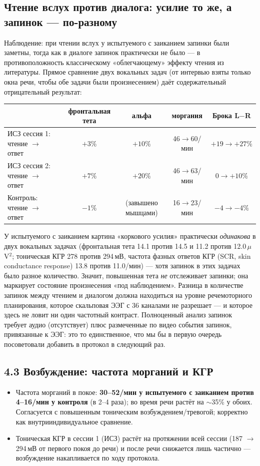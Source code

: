 \documentclass[11pt,a4paper]{article}
\begin{document}
\subsection*{Чтение вслух против диалога: усилие то же, а запинок --- по-разному}
Наблюдение: при чтении вслух у испытуемого с заиканием запинки были заметны, тогда как в диалоге
запинок практически не было --- в противоположность классическому «облегчающему» эффекту чтения
из литературы.
Прямое сравнение двух вокальных задач (от интервью взяты только окна речи, чтобы обе задачи были
произнесением) даёт содержательный отрицательный результат:
\begin{center}\small
\begin{tabular}{@{}lcccc@{}}
\toprule
& фронтальная тета & альфа & моргания & Брока L$-$R \\
\midrule
ИСЗ сессия 1: чтение $\to$ ответ & $+3\%$ & $+10\%$ & 46$\to$60/мин & $+19\to+27\%$ \\
ИСЗ сессия 2: чтение $\to$ ответ & $+7\%$ & $+20\%$ & 46$\to$63/мин & $0\to+10\%$ \\
Контроль: чтение $\to$ ответ & $-1\%$ & (завышено мышцами) & 16$\to$23/мин & $-4\to-4\%$ \\
\bottomrule
\end{tabular}
\end{center}
У испытуемого с заиканием картина «коркового усилия» практически \emph{одинакова} в двух вокальных
задачах (фронтальная тета 14.1 против 14.5 и 11.2 против 12.0\,$\mu$V$^2$; тоническая КГР 278 против
294\,мВ, частота фазных ответов КГР (SCR, skin conductance response) 13.8 против 11.0/мин) --- хотя запинок в этих задачах было разное количество. Значит, повышенная
тета \emph{не} отслеживает запинки; она маркирует состояние произнесения «под наблюдением».
Разница в количестве запинок между чтением и диалогом должна находиться на уровне речемоторного
планирования,
которое скальповая ЭЭГ с 36 каналами не разрешает --- и которое здесь не ловит ни один
частотный контраст. Полноценный анализ запинок требует аудио (отсутствует) плюс размеченные по
видео события запинок, привязанные к ЭЭГ: это то единственное, что мы бы в первую очередь
посоветовали добавить в протокол в следующий раз.

\subsection*{4.3 Возбуждение: частота морганий и КГР}
\begin{itemize}\setlength\itemsep{1pt}
\item Частота морганий в покое: \textbf{30--52/мин у испытуемого с заиканием против 4--16/мин
у контроля} (в 2--4 раза); во время речи растёт на $\sim$35\% у обоих. Согласуется с повышенным
тоническим возбуждением/тревогой; корректно как внутрииндивидуальное сравнение.
\item Тоническая КГР в сессии 1 (ИСЗ) растёт на протяжении всей сессии (187 $\rightarrow$ 294\,мВ от первого
покоя до речи) и после речи снижается лишь частично --- возбуждение накапливается по ходу протокола.
\end{itemize}
\end{document}
